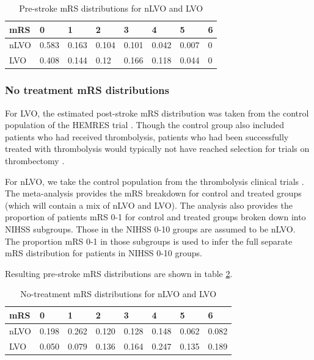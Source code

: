 \begin{table}
\caption{Pre-stroke mRS distributions for nLVO and LVO}\label{tab:pre_stroke}
\centering
\begin{tabular}{l | l l l l l l l}
mRS & 0 & 1 & 2 & 3 & 4 & 5 & 6 \\
\hline
nLVO & 0.583 & 0.163 & 0.104 & 0.101 & 0.042 & 0.007 & 0 \\
LVO & 0.408 & 0.144 & 0.12 & 0.166 & 0.118 & 0.044 & 0 \\
\end{tabular}
\end{table}

\subsubsection{No treatment mRS distributions}

For LVO, the estimated post-stroke mRS distribution was taken from the control population of the HEMRES trial \cite{goyal_endovascular_2016}. Though the control group also included patients who had received thrombolysis, patients who had been successfully treated with thrombolysis would typically not have reached selection for trials on thrombectomy \cite{tsivgoulis_successful_2018}.


For nLVO, we take the control population from the thrombolysis clinical trials \cite{emberson_effect_2014}. The meta-analysis provides the mRS breakdown for control and treated groups (which will contain a mix of nLVO and LVO). The analysis also provides the proportion of patients mRS 0-1 for control and treated groups broken down into NIHSS subgroups. Those in the NIHSS 0-10 groups are assumed to be nLVO. The proportion mRS 0-1 in those subgroups is used to infer the full separate mRS distribution for patients in NIHSS 0-10 groups. 

Resulting pre-stroke mRS distributions are shown in table \ref{tab:no_treatment}. 

\begin{table}
\caption{No-treatment mRS distributions for nLVO and LVO}\label{tab:no_treatment}
\centering
\begin{tabular}{l | l l l l l l l}
mRS & 0 & 1 & 2 & 3 & 4 & 5 & 6 \\
\hline
nLVO & 0.198 & 0.262 & 0.120 & 0.128 & 0.148 & 0.062 & 0.082 \\
LVO & 0.050 & 0.079 & 0.136 & 0.164 & 0.247 & 0.135 & 0.189 \\
\end{tabular}
\end{table}

